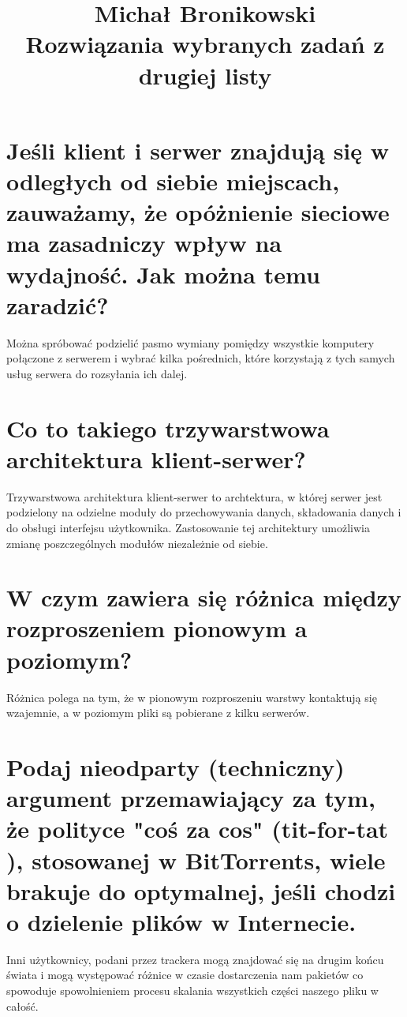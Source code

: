\documentclass[10pt,a4paper]{article}
\title{Michał Bronikowski \protect\\ Rozwiązania wybranych zadań z drugiej listy}
\begin{document}
\maketitle
\thispagestyle{empty}
\newpage
\section{\normalsize{Jeśli klient i serwer znajdują się w odległych od siebie miejscach, zauważamy, że opóżnienie sieciowe ma zasadniczy wpływ na wydajność. Jak można temu zaradzić?}}
Można spróbować podzielić pasmo wymiany pomiędzy wszystkie komputery połączone z serwerem i wybrać kilka pośrednich, które korzystają z tych samych usług serwera do rozsyłania ich dalej.
\section{\normalsize{Co to takiego trzywarstwowa architektura klient-serwer?}}
Trzywarstwowa architektura klient-serwer to archtektura, w której serwer jest podzielony na odzielne moduły do przechowywania danych,  składowania danych i do obsługi interfejsu użytkownika. Zastosowanie tej architektury umożliwia zmianę poszczególnych modułów niezależnie od siebie.
\section{\normalsize{W czym zawiera się różnica między rozproszeniem pionowym a poziomym?}}
Różnica polega na tym, że w pionowym rozproszeniu warstwy kontaktują się wzajemnie, a w poziomym pliki są pobierane z kilku serwerów. 
\section{\normalsize{Podaj nieodparty (techniczny) argument przemawiający za tym, że polityce "coś za cos" (tit-for-tat ), stosowanej w BitTorrents, wiele brakuje do optymalnej, jeśli chodzi o dzielenie plików w Internecie.}}
Inni użytkownicy, podani przez trackera mogą znajdować się na drugim końcu świata i mogą występować różnice w czasie dostarczenia nam pakietów co spowoduje spowolnieniem procesu skalania wszystkich części naszego pliku w całość.
\end{document}
